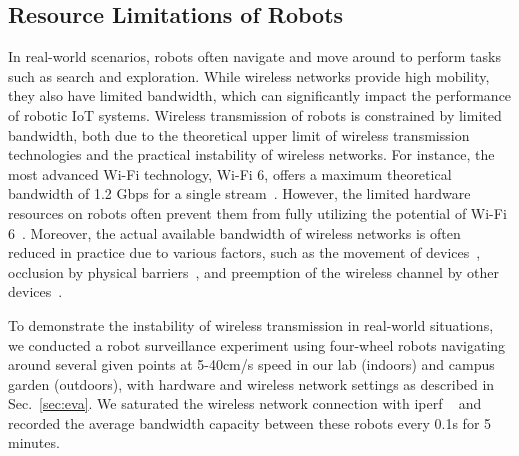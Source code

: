 
\subsection{Resource Limitations of Robots}
In real-world scenarios, robots often navigate and move around to perform tasks such as search and exploration. 
While wireless networks provide high mobility, they also have limited bandwidth, which can significantly impact the performance of robotic IoT systems.
Wireless transmission of robots is constrained by limited bandwidth, both due to the theoretical upper limit of wireless transmission technologies and the practical instability of wireless networks. 
For instance, the most advanced Wi-Fi technology, Wi-Fi 6, offers a maximum theoretical bandwidth of 1.2 Gbps for a single stream~\cite{liu2023first}. However, the limited hardware resources on robots often prevent them from fully utilizing the potential of Wi-Fi 6~\cite{yang2022mobile}. 
Moreover, the actual available bandwidth of wireless networks is often reduced in practice due to various factors, such as the movement of devices~\cite{masiukiewicz2019throughput, pei2013connectivity}, occlusion by physical barriers~\cite{ding2015performance, sarkar2013effect}, and preemption of the wireless channel by other devices~\cite{adame2021time, ren2018proportional}.

To demonstrate the instability of wireless transmission in real-world situations, we conducted a robot surveillance experiment using four-wheel robots navigating around several given points at 5-40cm/s speed in our lab (indoors) and campus garden (outdoors), with hardware and wireless network settings as described in Sec.~\ref{sec:eva}. 
We saturated the wireless network connection with iperf ~\cite{noauthor_iperf_nodate} and recorded the average bandwidth capacity between these robots every 0.1s for 5 minutes.


